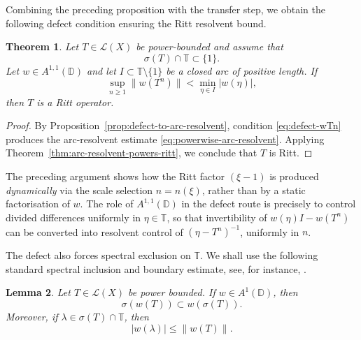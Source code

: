 \documentclass[11pt]{amsart}
\numberwithin{equation}{section}
\newtheorem{theorem}{Theorem}[section]
\newtheorem{lemma}[theorem]{Lemma}
\theoremstyle{definition}
\theoremstyle{plain}
\def\T{\mathbb{T}}
\def\L{L}
\def\D{\mathbb{D}}
\renewcommand{\L}{\mathcal L}
\begin{document}
Combining the preceding proposition with the transfer step, we obtain the
following defect condition ensuring the Ritt resolvent bound.

\begin{theorem}\label{thm:power-KB-arc}
Let $T\in\L(X)$ be power-bounded and assume that
\[
  \sigma(T)\cap\T\subset\{1\}.
\]
Let $w\in A^{1,1}(\D)$ and
let 
$I\subset\T\setminus\{1\}$ be a closed arc
of positive length. If
\[
  \sup_{n\ge1}\|w(T^n)\|< \min_{\eta\in I} |w(\eta)|,
\]
then $T$ is a Ritt operator.
\end{theorem}

\begin{proof}
By Proposition~\ref{prop:defect-to-arc-resolvent}, condition \eqref{eq:defect-wTn}
produces the arc-resolvent estimate \eqref{eq:powerwise-arc-resolvent}.
Applying Theorem~\ref{thm:arc-resolvent-powers-ritt}, we conclude that $T$ is Ritt.
\end{proof}

The preceding argument shows how the Ritt factor $(\xi-1)$ is produced \emph{dynamically} via the scale selection $n=n(\xi)$, rather than by a static factorisation of $w$. The role of $A^{1,1}(\D)$ in the defect route is precisely to control divided differences uniformly in $\eta\in\T$, so that invertibility of $w(\eta)I-w(T^n)$ can be converted into resolvent control of $(\eta -T^n)^{-1}$, uniformly in $n$.



The defect also forces spectral exclusion on $\T$. We shall use the following
standard spectral inclusion and boundary estimate, see, for instance,
\cite[Theorem 3.35]{LeMerdy}.




\begin{lemma}\label{lem:approx-point}
Let $T\in\L(X)$ be power bounded.
If $w\in A^1(\D)$, then
\begin{equation}\label{eq:A1-spectral-mapping}
        \sigma(w(T))\subset w(\sigma(T)).
\end{equation}
Moreover, if $\lambda\in\sigma(T)\cap\T$, then
\begin{equation}\label{eq:w-lambda-bound}
        |w(\lambda)|\le \|w(T)\|.
\end{equation}
\end{lemma}
\end{document}
